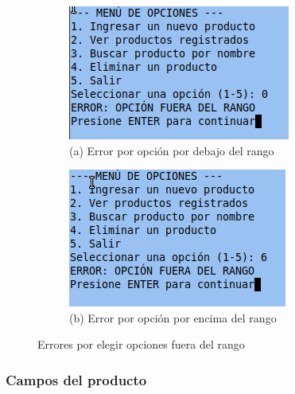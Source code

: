 \documentclass[12pt]{article}
\begin{document}
\begin{figure}[H]
    \centering

    \begin{subfigure}[b]{0.4\textwidth}
        \centering
        \includegraphics[width=\textwidth]{Imagenes/img7.png}
        \caption*{(a) Error por opción por debajo del rango}
    \end{subfigure}
    \hfill
    \begin{subfigure}[b]{0.4\textwidth}
        \centering
        \includegraphics[width=\textwidth]{Imagenes/img8.png}
        \caption*{(b) Error por opción por encima del rango}
    \end{subfigure}

    \caption{Errores por elegir opciones fuera del rango}
    \label{fig:error rango de opciones}
\end{figure}

\subsubsection{Campos del producto}
\end{document}
